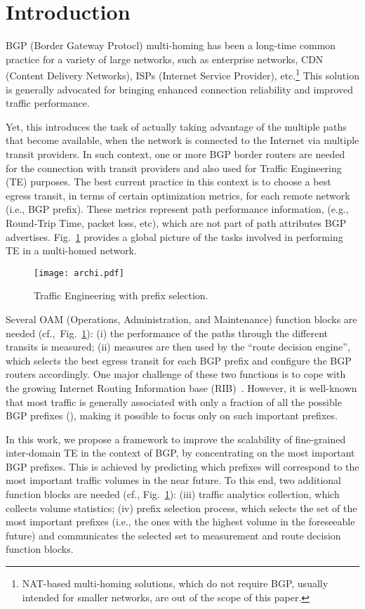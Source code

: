 \documentclass[10pt, conference,letterpaper]{IEEEtran}
\begin{document}
\section{Introduction}

BGP (Border Gateway Protocl) multi-homing has been a long-time common practice for a variety of large networks, such as enterprise networks,  CDN (Content Delivery Networks), ISPs (Internet Service Provider), etc.\footnote{NAT-based multi-homing solutions, which do not require BGP, usually intended for smaller networks, are out of the scope of this paper.}
This solution is generally advocated for bringing enhanced connection reliability 
and improved traffic performance.

Yet, this introduces the task of actually taking advantage of the multiple paths that become available,
when the network is connected to the Internet via multiple transit providers.
In such context, one or more BGP border routers are needed for the connection with transit providers and also used for Traffic Engineering (TE) purposes.
The best current practice in this context is to choose a best egress transit, in terms of certain optimization metrics, for each remote network (i.e., BGP prefix).
These metrics represent path performance information, (e.g., Round-Trip Time, packet loss, etc), which are not part of path attributes BGP advertises.
Fig.~\ref{fig:archi} provides a global picture of the tasks involved in performing TE in a multi-homed network. 
\begin{figure}[!tb]
\centering
\texttt{[image: archi.pdf]}
\caption{Traffic Engineering with prefix selection.}
\label{fig:archi}
\end{figure}
Several OAM (Operations, Administration, and Maintenance) function blocks are needed (cf.,~Fig.~\ref{fig:archi}): (i) the performance of the paths through the different transits is measured; (ii) measures are then used by the ``route decision engine'', which selects the best egress transit for each BGP prefix and configure the BGP routers accordingly.
One major challenge of these two functions is to cope with the growing Internet Routing Information base (RIB)~\cite{potaroo}.
However, it is well-known that most traffic is generally associated with only a fraction of all the possible BGP prefixes (\cite{Fang1999, Feamster2003, Papagiannaki2005, Sarrar2012}), 
making it possible to focus only on such important prefixes. 


In this work, we propose a framework to improve the scalability of fine-grained inter-domain TE in the context of BGP, by concentrating on the most important BGP prefixes. 
This is achieved by predicting which prefixes will correspond to the most important traffic volumes in the near future.  
To this end, two additional function blocks are needed (cf., Fig.~\ref{fig:archi}): (iii) traffic analytics collection, which collects volume statistics; (iv) prefix selection process, which selects the set of the most important prefixes (i.e., the ones with the highest volume in the foreseeable future) and communicates the selected set to measurement and route decision function blocks.
\end{document}

